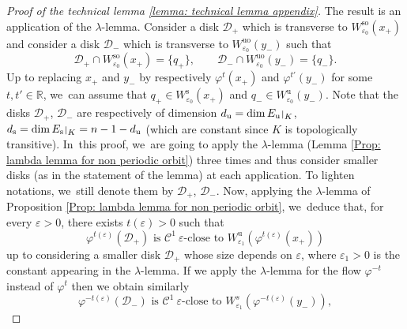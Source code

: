 \documentclass[11pt]{article}
\newcommand{\rs}{\mathrm{s}}
\newcommand{\rso}{\mathrm{so}}
\newcommand{\ru}{\mathrm{u}}
\newcommand{\ruo}{\mathrm{uo}}
\theoremstyle{definition}
\theoremstyle{plain}
\newcommand{\Ccal}{\mathcal{C}}
\newcommand{\D}{\mathcal{D}}
\newcommand{\R}{\mathbb{R}}
\def\rest#1#2{\mathchoice
{\setbox1\hbox{${\displaystyle #1}_{\scriptstyle #2}$}
\restrictionaux{#1}{#2}}
{\setbox1\hbox{${\textstyle #1}_{\scriptstyle #2}$}
\restrictionaux{#1}{#2}}
{\setbox1\hbox{${\scriptstyle #1}_{\scriptscriptstyle #2}$}
\restrictionaux{#1}{#2}}
{\setbox1\hbox{${\scriptscriptstyle #1}_{\scriptscriptstyle #2}$}
\restrictionaux{#1}{#2}}}
\def\restrictionaux#1#2{{#1\,\smash{\vrule height.8\ht1 depth.85\dp1}}_{\,#2}}
\begin{document}
\begin{appendix}
\begin{proof}[Proof of the technical lemma \ref{lemma: technical lemma appendix}]
The result is an application of the $\lambda$-lemma. Consider a disk $\D_{+}$ which is transverse to $W_{\varepsilon_0}^{\rso} (x_+)$ and consider a disk $\D_{-}$ which is transverse to $W_{\varepsilon_0}^{\ruo} (y_-)$ such that
\[
\D_{+} \cap W_{\varepsilon_0}^{\rso} (x_+) = \{q_+ \}, \qquad \D_{-} \cap W_{\varepsilon_0}^{\ruo} (y_-) = \{q_- \}.
\]
Up to replacing $x_+$ and $y_-$ by respectively $\varphi^t (x_+)$ and $\varphi^{t'}(y_-)$ for some $t, t' \in \R$, we~can assume that $q_+ \in W_{\varepsilon_0}^\rs (x_+)$ and $q_- \in W_{\varepsilon_0}^\ru (y_-)$.
Note that the disks $\D_{+}$, $\D_-$ are respectively of dimension $d_{\ru} = \dim \rest{E_{\ru}}{K}$, $d_{\rs} = \dim \rest{E_{\rs}}{K} = n - 1 - d_{\ru}$ (which are constant since $K$ is topologically transitive). In~this proof, we~are going to apply the $\lambda$-lemma (Lemma \ref{Prop: lambda lemma for non periodic orbit}) three times and thus consider smaller disks (as in the statement of the lemma) at each application. To lighten notations, we~still denote them by $\D_{+}$, $\D_-$. Now, applying the $\lambda$-lemma of Proposition \ref{Prop: lambda lemma for non periodic orbit}, we~deduce that, for every $\varepsilon > 0$, there exists $t (\varepsilon) > 0$ such that
\[
\varphi^{t (\varepsilon)} (\D_{+}) \text{ is } \Ccal^1 \: \varepsilon\text{-close to } W_{\varepsilon_1}^{\ru} (\varphi^{ t (\varepsilon)} (x_+))
\]
up to considering a smaller disk $\D_+$ whose size depends on $\varepsilon$, where $\varepsilon_1 > 0$ is the constant appearing in the $\lambda$-lemma.
If we apply the $\lambda$-lemma for the flow $\varphi^{-t}$ instead of $\varphi^t$ then we obtain similarly
\begin{equation}\label{eq: proof technical lemma - reverse lambda lemma}
\varphi^{-t (\varepsilon)} (\D_{-}) \text{ is } \Ccal^1 \: \varepsilon\text{-close to } W_{\varepsilon_1}^{s} (\varphi^{ - t (\varepsilon)} (y_-)),
\end{equation}

\end{proof}
\end{appendix}
\end{document}
